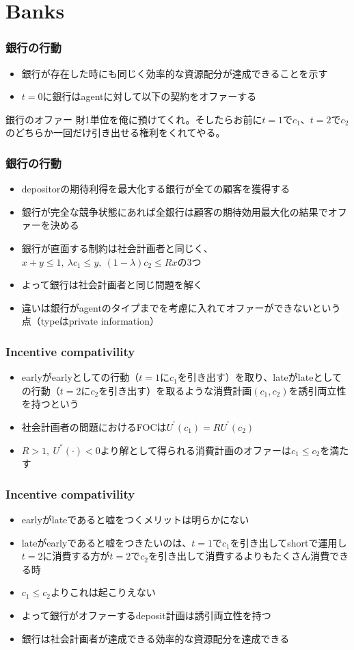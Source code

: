 \documentclass[dvipdfmx, 12pt]{beamer}
\begin{document}
\section{Banks}
\begin{frame}\frametitle{銀行の行動}
	\begin{itemize}
		\item 銀行が存在した時にも同じく効率的な資源配分が達成できることを示す
		\item $t = 0$に銀行はagentに対して以下の契約をオファーする
	\end{itemize}
	\begin{itembox}[l]{銀行のオファー}
	財1単位を俺に預けてくれ。そしたらお前に$t = 1$で$c_1$、$t = 2$で$c_2$のどちらか一回だけ引き出せる権利をくれてやる。
	\end{itembox}
\end{frame}
\begin{frame}\frametitle{銀行の行動}
	\begin{itemize}
		\item depositorの期待利得を最大化する銀行が全ての顧客を獲得する
		\item 銀行が完全な競争状態にあれば全銀行は顧客の期待効用最大化の結果でオファーを決める
		\item 銀行が直面する制約は社会計画者と同じく、$x + y \leq 1,\ \lambda c_1 \leq y,\ (1 - \lambda)c_2 \leq R x$の3つ
		\item よって銀行は社会計画者と同じ問題を解く
		\item 違いは銀行がagentのタイプまでを考慮に入れてオファーができないという点（typeはprivate information）
	\end{itemize}
\end{frame}
\begin{frame}\frametitle{Incentive compativility}
	\begin{itemize}
		\item earlyがearlyとしての行動（$t = 1$に$c_1$を引き出す）を取り、lateがlateとしての行動（$t = 2$に$c_2$を引き出す）を取るような消費計画$(c_1, c_2)$を誘引両立性を持つという
		\item 社会計画者の問題におけるFOCは$U^{'}(c_1) = R U^{'}(c_2)$
		\item $R > 1,\ U^{''}(\cdot) < 0$より解として得られる消費計画のオファーは$c_1 \leq c_2$を満たす
	\end{itemize}
\end{frame}
\begin{frame}\frametitle{Incentive compativility}
	\begin{itemize}
		\item earlyがlateであると嘘をつくメリットは明らかにない
		\item lateがearlyであると嘘をつきたいのは、$t = 1$で$c_1$を引き出してshortで運用し$t = 2$に消費する方が$t = 2$で$c_2$を引き出して消費するよりもたくさん消費できる時
		\item $c_1 \leq c_2$よりこれは起こりえない
		\item よって銀行がオファーするdeposit計画は誘引両立性を持つ
		\item 銀行は社会計画者が達成できる効率的な資源配分を達成できる
	\end{itemize}
\end{frame}
\end{document}
